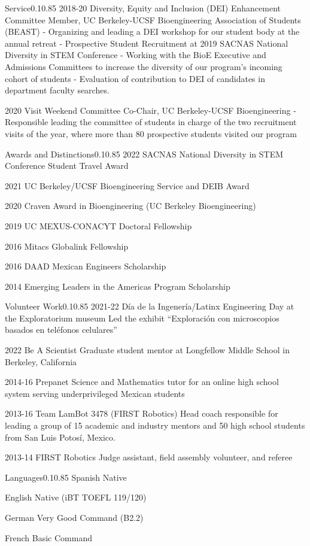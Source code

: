\documentclass{federico_cv}
\begin{document}
\begin{tblSection}{Service}{0.1}{0.85}
\leftbfrightsingle
{2018-20}
{Diversity, Equity and Inclusion (DEI) Enhancement Committee Member, UC Berkeley-UCSF Bioengineering Association of Students (BEAST)}
{- Organizing and leading a DEI workshop for our student body at the annual retreat}
{- Prospective Student Recruitment at 2019 SACNAS National Diversity in STEM Conference}
{- Working with the BioE Executive and Admissions Committees to increase the diversity of our program's incoming cohort of students}
{- Evaluation of contribution to DEI of candidates in department faculty searches.}

\leftbfrightsingle
{2020}
{Visit Weekend Committee Co-Chair, UC Berkeley-UCSF Bioengineering}
{- Responsible leading the committee of students in charge of the two recruitment visits of the year, where more than 80 prospective students visited our program}

\end{tblSection}


\begin{tblSection}{Awards and Distinctions}{0.1}{0.85}
\award
{2022}
{SACNAS National Diversity in STEM Conference Student Travel Award}

\award
{2021}
{UC Berkeley/UCSF Bioengineering Service and DEIB Award}

\award
{2020}
{Craven Award in Bioengineering (UC Berkeley Bioengineering)}

\award
{2019}
{UC MEXUS-CONACYT Doctoral Fellowship}

\award
{2016}
{Mitacs Globalink Fellowship}

\award
{2016}
{DAAD Mexican Engineers Scholarship}

\award
{2014}
{Emerging Leaders in the Americas Program Scholarship}

\end{tblSection}


\begin{tblSection}{Volunteer Work}{0.1}{0.85}
\job
{2021-22}
{Día de la Ingenería/Latinx Engineering Day at the Exploratorium museum}
{Led the exhibit ``Exploración con microscopios basados en teléfonos celulares''}

\job
{2022}
{Be A Scientist}
{Graduate student mentor at Longfellow Middle School in Berkeley, California}

\job
{2014-16}
{Prepanet}
{Science and Mathematics tutor for an online high school system serving underprivileged Mexican students}

\job
{2013-16}
{Team LamBot 3478 (FIRST Robotics)}
{Head coach responsible for leading a group of 15 academic and industry mentors and 50 high school students from San Luis Potosí, Mexico.}

\job
{2013-14}
{FIRST Robotics}
{Judge assistant, field assembly volunteer, and referee}

\end{tblSection}


\begin{tblSection}{Languages}{0.1}{0.85}
\leftrightsingletight
{Spanish}
{Native}

\leftrightsingletight
{English}
{Native (iBT TOEFL 119/120)}

\leftrightsingletight
{German}
{Very Good Command (B2.2)}

\leftrightsingletight
{French}
{Basic Command}

\end{tblSection}
\end{document}
